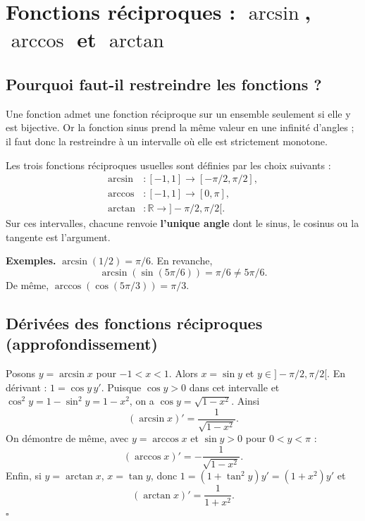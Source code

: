 \documentclass[../cours_spe_trigo.tex]{subfiles}
\begin{document}
\setcounter{chapter}{14}
\chapter{Fonctions réciproques : \texorpdfstring{$\arcsin$, $\arccos$ et $\arctan$}{arcsin, arccos et arctan}}
\section{Pourquoi faut-il restreindre les fonctions ?}
Une fonction admet une fonction réciproque sur un ensemble seulement si elle y est bijective. Or la fonction sinus prend la même valeur en une infinité d'angles ; il faut donc la restreindre à un intervalle où elle est strictement monotone.
\begin{definition}
Les trois fonctions réciproques usuelles sont définies par les choix suivants :
\[
\begin{aligned}
\arcsin &: [-1,1]\longrightarrow[-\pi/2,\pi/2],\\
\arccos &: [-1,1]\longrightarrow[0,\pi],\\
\arctan &: \mathbb R\longrightarrow]-\pi/2,\pi/2[.
\end{aligned}
\]
Sur ces intervalles, chacune renvoie \textbf{l'unique angle} dont le sinus, le cosinus ou la tangente est l'argument.
\end{definition}
\textbf{Exemples.} $\arcsin(1/2)=\pi/6$. En revanche,
\[\arcsin(\sin(5\pi/6))=\pi/6\ne5\pi/6.\]
De même, $\arccos(\cos(5\pi/3))=\pi/3$.
\section{Dérivées des fonctions réciproques (approfondissement)}
\begin{demonstration}
Posons $y=\arcsin x$ pour $-1<x<1$. Alors $x=\sin y$ et $y\in]-\pi/2,\pi/2[$. En dérivant : $1=\cos y\,y'$. Puisque $\cos y>0$ dans cet intervalle et $\cos^2y=1-\sin^2y=1-x^2$, on a $\cos y=\sqrt{1-x^2}$. Ainsi
\[\boxed{(\arcsin x)'=\frac1{\sqrt{1-x^2}}.}\]
On démontre de même, avec $y=\arccos x$ et $\sin y>0$ pour $0<y<\pi$ :
\[\boxed{(\arccos x)'=-\frac1{\sqrt{1-x^2}}.}\]
Enfin, si $y=\arctan x$, $x=\tan y$, donc $1=(1+\tan^2y)y'=(1+x^2)y'$ et
\[\boxed{(\arctan x)'=\frac1{1+x^2}.}\]
$\square$
\end{demonstration}
\end{document}
